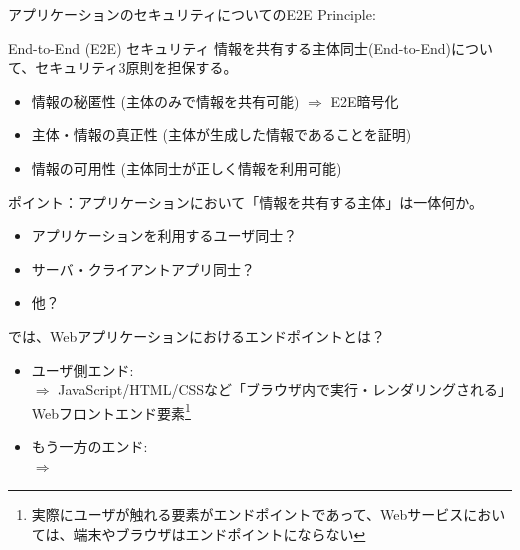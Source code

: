 \documentclass[12pt,dvipdfmx]{beamer}
\begin{document}
\begin{frame}
アプリケーションのセキュリティについてのE2E Principle:
\begin{block}{End-to-End (E2E) セキュリティ}
情報を共有する主体同士(End-to-End)について、セキュリティ3原則を担保する。
\begin{itemize}
 \item 情報の秘匿性 (主体のみで情報を共有可能) $\Rightarrow$ \alert{E2E暗号化}
 \item 主体・情報の真正性 (主体が生成した情報であることを証明)
 \item 情報の可用性 (主体同士が正しく情報を利用可能)
\end{itemize}
\end{block}

\end{frame}

\begin{frame}
ポイント：アプリケーションにおいて「情報を共有する主体」は一体何か。
\begin{itemize}
 \item アプリケーションを利用するユーザ同士？
 \item サーバ・クライアントアプリ同士？
 \item 他？
\end{itemize}
\end{frame}

\begin{frame}
では、Webアプリケーションにおけるエンドポイントとは？
\begin{itemize}
\item ユーザ側エンド:\\
 $\Rightarrow$ \alert{JavaScript/HTML/CSSなど「ブラウザ内で実行・レンダリングされる」Webフロントエンド要素}\footnote[frame]{\scriptsize 実際にユーザが触れる要素がエンドポイントであって、\alert{Webサービスにおいては、端末やブラウザはエンドポイントにならない}}\\
\item もう一方のエンド:\\
 $\Rightarrow$ 
\end{itemize}

\end{frame}
\end{document}
